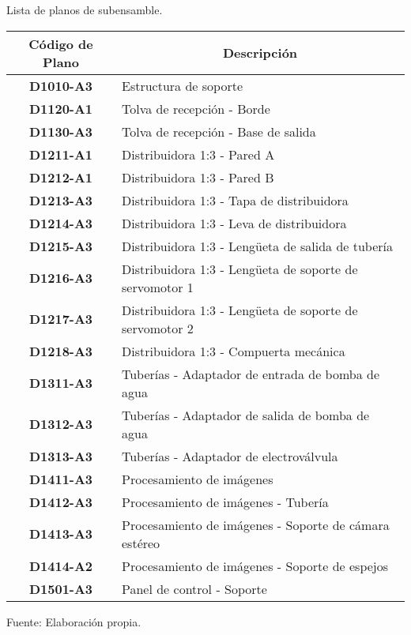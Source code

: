 \begin{mytable}[H]
	\footnotesize\centering
	\caption{Lista de planos de subensamble.}
	\label{tab:lista de planos de subensamble}
	\begin{tabular}{|c|l|}
		\hline
		\multicolumn{1}{|c|}{\textbf{Código de Plano}} & \multicolumn{1}{c|}{\textbf{Descripción}} \\ \hline
		\textbf{D1010-A3}         & Estructura de soporte  \\ \hline
		\textbf{D1120-A1}         & Tolva de recepción - Borde \\ \hline
		\textbf{D1130-A3}         & Tolva de recepción - Base de salida \\ \hline
		\textbf{D1211-A1}         & Distribuidora 1:3 - Pared A \\ \hline
		\textbf{D1212-A1}         & Distribuidora 1:3 - Pared B \\ \hline
		\textbf{D1213-A3}         & Distribuidora 1:3 - Tapa de distribuidora \\ \hline
		\textbf{D1214-A3}         & Distribuidora 1:3 - Leva de distribuidora \\ \hline
		\textbf{D1215-A3}         & Distribuidora 1:3 - Lengüeta de salida de tubería \\ \hline
		\textbf{D1216-A3}         & Distribuidora 1:3 - Lengüeta de soporte de servomotor 1 \\ \hline
		\textbf{D1217-A3}         & Distribuidora 1:3 - Lengüeta de soporte de servomotor 2 \\ \hline 
		\textbf{D1218-A3}         & Distribuidora 1:3 - Compuerta mecánica \\ \hline 
		\textbf{D1311-A3}         & Tuberías - Adaptador de entrada de bomba de agua \\ \hline 
		\textbf{D1312-A3}         & Tuberías - Adaptador de salida de bomba de agua \\ \hline 
		\textbf{D1313-A3}         & Tuberías - Adaptador de electroválvula\\ \hline
		\textbf{D1411-A3}         & Procesamiento de imágenes \\ \hline
		\textbf{D1412-A3}         & Procesamiento de imágenes - Tubería \\ \hline
		\textbf{D1413-A3}         & Procesamiento de imágenes - Soporte de cámara estéreo \\ \hline
		\textbf{D1414-A2}         & Procesamiento de imágenes - Soporte de espejos \\ \hline
		\textbf{D1501-A3}         & Panel de control - Soporte \\ \hline
	\end{tabular}
	\begin{myflushcenteraftertable}	
		Fuente: Elaboración propia.
	\end{myflushcenteraftertable}
\end{mytable}

